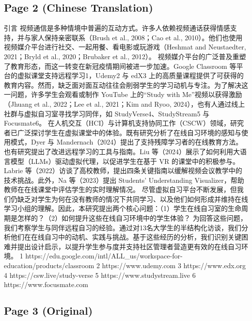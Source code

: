 \documentclass[12pt]{ctexart}
\begin{document}
\subsection*{Page 2 (Chinese Translation)}

引言
视频通信是多种情境中普遍的互动方式。许多人依赖视频通话获得情感支持，并与家人保持亲密联系（Brush et al., 2008；Cao et al., 2010）。他们也使用视频媒介平台进行社交、一起用餐、看电影或玩游戏（Heshmat and Neustaedter, 2021；Bryld et al., 2020；Brubaker et al., 2012）。
视频媒介平台的广泛普及重塑了教育形态，而这一转变在新冠疫情期间被进一步加速。Google Classroom 等平台的虚拟课堂支持远程学习1，Udemy2 与 edX3 上的高质量课程提供了可获得的教育内容。然而，缺乏面对面互动往往会削弱学生的学习动机与专注。为了解决这一问题，许多学生会观看或制作 YouTube 上的“Study with Me”视频以获得激励（Jhuang et al., 2022；Lee et al., 2021；Kim and Ryoo, 2024），也有人通过线上社群与虚拟自习室寻找学习同伴，如 StudyVerse4、StudyStream5 与 Focusmate6。
在人机交互（HCI）与计算机支持协同工作（CSCW）领域，研究者已广泛探讨学生在虚拟课堂中的体验。既有研究分析了在线自习环境的感知与使用模式，Dyer 与 Mandernach（2024）提出了支持残障学习者的在线教育方法。也有研究提出了改进远程学习的工具与指南。Liu 等（2024）展示了如何利用大语言模型（LLMs）驱动虚拟代理，以促进学生在基于 VR 的课堂中的积极参与。Labrie 等（2022）访谈了高校教师，提出四条关键指南以缓解视频会议教学中的技术挑战。此外，Na 等（2023）提出 Students’ Understanding Visualizer，帮助教师在在线课堂中评估学生的实时理解情况。
尽管虚拟自习平台不断发展，但我们仍缺乏对学生为何在没有教师的情况下共同学习、以及他们如何形成并维持在线学习小组的理解。因此，本研究提出两个核心问题：（1）学生在线自习室的生命周期是怎样的？（2）如何提升这些在线自习环境中的学生体验？
为回答这些问题，我们考察学生与同伴远程自习的经验。通过对13名大学生的半结构化访谈，我们分析他们在在线自习中的动机、实践与挑战。基于这些经历的分析，我们识别关键困难并提出设计启示，以提升学生参与度并支持社区管理者营造更有效的在线自习环境。
1 https://edu.google.com/intl/ALL\_us/workspace-for-education/products/classroom
2 https://www.udemy.com
3 https://www.edx.org
4 https://csw.live/study-verse
5 https://www.studystream.live
6 https://www.focusmate.com

\subsection*{Page 3 (Original)}
\end{document}

